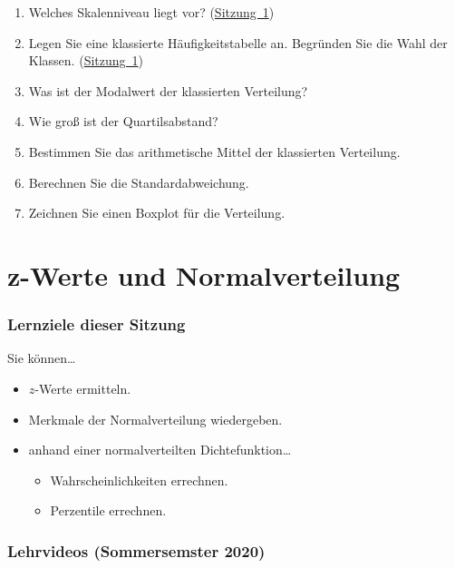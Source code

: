 \documentclass[
  11pt,
  ngerman,
  a4paper,
]{report}
\providecommand{\tightlist}{%
  \setlength{\itemsep}{0pt}\setlength{\parskip}{0pt}}
\begin{document}
\begin{enumerate}
\def\labelenumi{\alph{enumi})}
\tightlist
\item
  Welches Skalenniveau liegt vor? (\protect\hyperlink{skalenniveaus}{Sitzung~1})
\item
  Legen Sie eine klassierte Häufigkeitstabelle an. Begründen Sie die Wahl der Klassen. (\protect\hyperlink{quantitative-variablen-1}{Sitzung~1})
\item
  Was ist der Modalwert der klassierten Verteilung?
\item
  Wie groß ist der Quartilsabstand?
\item
  Bestimmen Sie das arithmetische Mittel der klassierten Verteilung.
\item
  Berechnen Sie die Standardabweichung.
\item
  Zeichnen Sie einen Boxplot für die Verteilung.
\end{enumerate}

\hypertarget{z-werte-und-normalverteilung}{%
\chapter{z-Werte und Normalverteilung}\label{z-werte-und-normalverteilung}}

\hypertarget{lernziele-dieser-sitzung-2}{%
\subsection*{Lernziele dieser Sitzung}\label{lernziele-dieser-sitzung-2}}

Sie können\ldots{}

\begin{itemize}
\tightlist
\item
  \(z\)-Werte ermitteln.
\item
  Merkmale der Normalverteilung wiedergeben.
\item
  anhand einer normalverteilten Dichtefunktion\ldots{}

  \begin{itemize}
  \tightlist
  \item
    Wahrscheinlichkeiten errechnen.
  \item
    Perzentile errechnen.
  \end{itemize}
\end{itemize}

\hypertarget{lehrvideos-sommersemster-2020}{%
\subsection*{Lehrvideos (Sommersemster 2020)}\label{lehrvideos-sommersemster-2020}}
\end{document}
